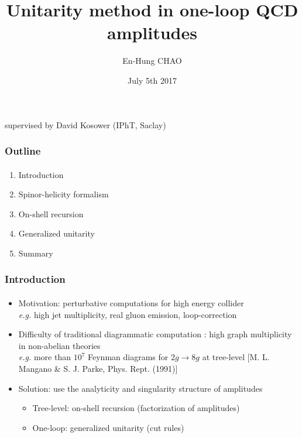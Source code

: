 \documentclass[english]{beamer}
\title{Unitarity method in one-loop QCD amplitudes}
\author{En-Hung CHAO}
\institute{{\'E}cole Normale Sup{\'e}rieure}
\date{July 5th 2017}
\newcommand{\eg}{\textit{e.g. }}
\begin{document}

\begin{frame}
\titlepage%
\centerline{supervised by David Kosower (IPhT, Saclay)}
\end{frame}
\begin{frame}
\frametitle{Outline}
\framesubtitle{}

\begin{enumerate}

\item Introduction
\item Spinor-helicity formalism
\item On-shell recursion
\item Generalized unitarity
\item Summary

\end{enumerate}

\end{frame}
\begin{frame}
\frametitle{Introduction}
\framesubtitle{}

\begin{itemize}
\item<1-> Motivation: perturbative computations for high energy collider \\ \eg high jet multiplicity, real gluon emission, loop-correction
\item<2-> Difficulty of traditional diagrammatic computation :
     high graph multiplicity in non-abelian theories \\
     \eg more than $10^7$ Feynman diagrams for $2g\rightarrow 8g$ at tree-level 
     \tiny\color{blue}[M. L. Mangano \& S. J. Parke, Phys.
Rept. (1991)]\color{black}\normalsize
\item<3-> Solution: use the analyticity and singularity structure of amplitudes
    \begin{itemize}
    \item<4-> Tree-level: on-shell recursion (factorization of amplitudes)
    \item<5-> One-loop: generalized unitarity (cut rules)
    \end{itemize}
\end{itemize}
\end{frame}
\end{document}
